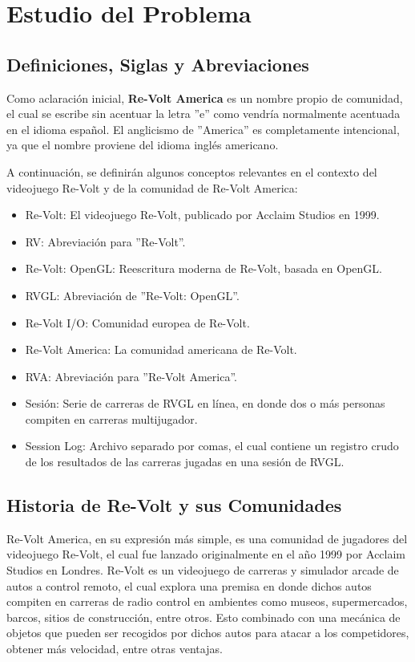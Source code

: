 \chapter{Estudio del Problema}

\section{Definiciones, Siglas y Abreviaciones}
Como aclaración inicial, \textbf{Re-Volt America} es un nombre propio de comunidad, el cual se escribe sin acentuar la letra ''e'' como vendría normalmente acentuada en el idioma español. El anglicismo de ''America'' es completamente intencional, ya que el nombre proviene del idioma inglés americano.

A continuación, se definirán algunos conceptos relevantes en el contexto del videojuego Re-Volt y de la comunidad de Re-Volt America:

\begin{itemize}
	\item Re-Volt: El videojuego Re-Volt, publicado por Acclaim Studios en 1999.
	\item RV: Abreviación para ''Re-Volt''.
	\item Re-Volt: OpenGL: Reescritura moderna de Re-Volt, basada en OpenGL.
	\item RVGL: Abreviación de ''Re-Volt: OpenGL''.
	\item Re-Volt I/O: Comunidad europea de Re-Volt.
	\item Re-Volt America: La comunidad americana de Re-Volt.
	\item RVA: Abreviación para ''Re-Volt America''.
	\item Sesión: Serie de carreras de RVGL en línea, en donde dos o más personas compiten en carreras multijugador.
	\item Session Log: Archivo separado por comas, el cual contiene un registro crudo de los resultados de las carreras jugadas en una sesión de RVGL.
\end{itemize}

\section{Historia de Re-Volt y sus Comunidades}
Re-Volt America, en su expresión más simple, es una comunidad de jugadores del videojuego Re-Volt, el cual fue lanzado originalmente en el año 1999 por Acclaim Studios en Londres. Re-Volt es un videojuego de carreras y simulador arcade de autos a control remoto, el cual explora una premisa en donde dichos autos compiten en carreras de radio control en ambientes como museos, supermercados, barcos, sitios de construcción, entre otros. Esto combinado con una mecánica de objetos que pueden ser recogidos por dichos autos para atacar a los competidores, obtener más velocidad, entre otras ventajas.

